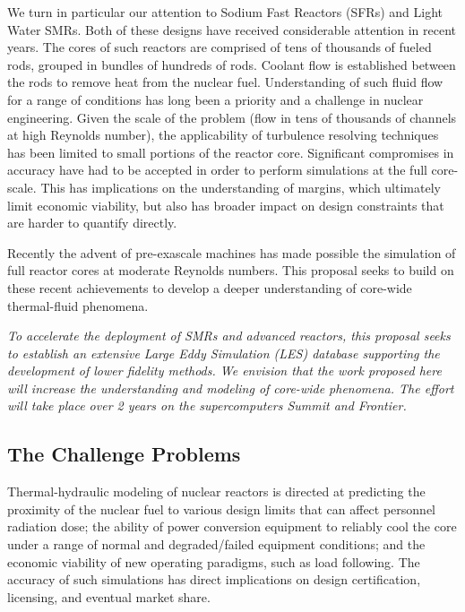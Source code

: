 \documentclass[11pt,letterpaper,english]{article}
\begin{document}
We turn in particular our attention to Sodium Fast Reactors (SFRs) and Light Water SMRs. Both of these designs have received considerable attention in recent years. The cores of such reactors are comprised of tens of thousands of fueled rods, grouped in bundles of hundreds of rods. Coolant flow is established between the rods to remove heat from the nuclear fuel. Understanding of such fluid flow for a range of conditions has long been a priority and a challenge in nuclear engineering. Given the scale of the problem (flow in tens of thousands of channels at high Reynolds number), the applicability of turbulence resolving techniques has been limited to small portions of the reactor core. Significant compromises in accuracy have had to be accepted in order to perform simulations at the full core-scale. This has implications on the understanding of margins, which ultimately limit economic viability, but also has broader impact on design constraints that are harder to quantify directly.

Recently the advent of pre-exascale machines has made possible the simulation of full reactor cores at moderate Reynolds numbers. This proposal seeks to build on these recent achievements to develop a deeper understanding of core-wide thermal-fluid phenomena.

\textit{To accelerate the deployment of SMRs and advanced reactors, this proposal seeks to establish an extensive Large Eddy Simulation (LES) database supporting the development of lower fidelity methods. We envision that the work proposed here will increase the understanding and modeling of core-wide phenomena. The effort will take place over 2 years on the supercomputers Summit and Frontier.}

\vspace{-.25in}
\subsection{The Challenge Problems}
\vspace{-.2in}


Thermal-hydraulic modeling of nuclear reactors is directed at predicting the proximity of the nuclear fuel to various design limits that can affect personnel radiation dose; the ability of power conversion equipment to reliably cool the core under a range of normal and degraded/failed equipment conditions; and the economic viability of new operating paradigms, such as load following. The accuracy of such simulations has direct implications on design certification, licensing, and eventual market share. 
\end{document}
